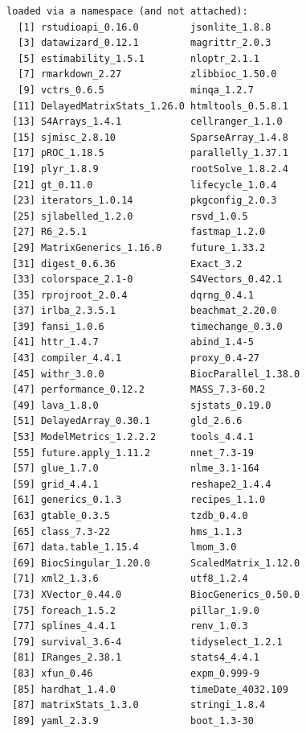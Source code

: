 \documentclass[
  letterpaper,
  DIV=11,
  numbers=noendperiod]{scrreprt}
\begin{document}
\begin{verbatim}
loaded via a namespace (and not attached):
  [1] rstudioapi_0.16.0         jsonlite_1.8.8           
  [3] datawizard_0.12.1         magrittr_2.0.3           
  [5] estimability_1.5.1        nloptr_2.1.1             
  [7] rmarkdown_2.27            zlibbioc_1.50.0          
  [9] vctrs_0.6.5               minqa_1.2.7              
 [11] DelayedMatrixStats_1.26.0 htmltools_0.5.8.1        
 [13] S4Arrays_1.4.1            cellranger_1.1.0         
 [15] sjmisc_2.8.10             SparseArray_1.4.8        
 [17] pROC_1.18.5               parallelly_1.37.1        
 [19] plyr_1.8.9                rootSolve_1.8.2.4        
 [21] gt_0.11.0                 lifecycle_1.0.4          
 [23] iterators_1.0.14          pkgconfig_2.0.3          
 [25] sjlabelled_1.2.0          rsvd_1.0.5               
 [27] R6_2.5.1                  fastmap_1.2.0            
 [29] MatrixGenerics_1.16.0     future_1.33.2            
 [31] digest_0.6.36             Exact_3.2                
 [33] colorspace_2.1-0          S4Vectors_0.42.1         
 [35] rprojroot_2.0.4           dqrng_0.4.1              
 [37] irlba_2.3.5.1             beachmat_2.20.0          
 [39] fansi_1.0.6               timechange_0.3.0         
 [41] httr_1.4.7                abind_1.4-5              
 [43] compiler_4.4.1            proxy_0.4-27             
 [45] withr_3.0.0               BiocParallel_1.38.0      
 [47] performance_0.12.2        MASS_7.3-60.2            
 [49] lava_1.8.0                sjstats_0.19.0           
 [51] DelayedArray_0.30.1       gld_2.6.6                
 [53] ModelMetrics_1.2.2.2      tools_4.4.1              
 [55] future.apply_1.11.2       nnet_7.3-19              
 [57] glue_1.7.0                nlme_3.1-164             
 [59] grid_4.4.1                reshape2_1.4.4           
 [61] generics_0.1.3            recipes_1.1.0            
 [63] gtable_0.3.5              tzdb_0.4.0               
 [65] class_7.3-22              hms_1.1.3                
 [67] data.table_1.15.4         lmom_3.0                 
 [69] BiocSingular_1.20.0       ScaledMatrix_1.12.0      
 [71] xml2_1.3.6                utf8_1.2.4               
 [73] XVector_0.44.0            BiocGenerics_0.50.0      
 [75] foreach_1.5.2             pillar_1.9.0             
 [77] splines_4.4.1             renv_1.0.3               
 [79] survival_3.6-4            tidyselect_1.2.1         
 [81] IRanges_2.38.1            stats4_4.4.1             
 [83] xfun_0.46                 expm_0.999-9             
 [85] hardhat_1.4.0             timeDate_4032.109        
 [87] matrixStats_1.3.0         stringi_1.8.4            
 [89] yaml_2.3.9                boot_1.3-30              

\end{verbatim}
\end{document}
